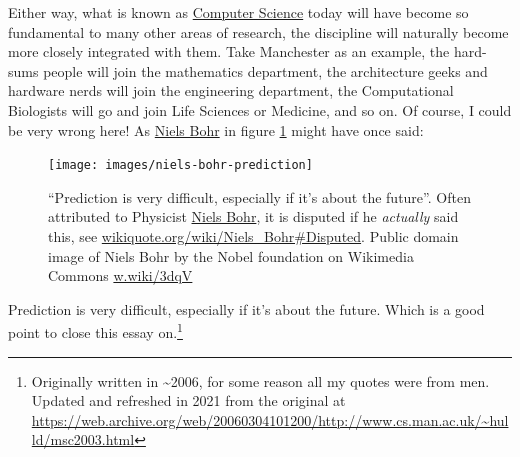 \documentclass[
  12pt,
]{book}
\begin{document}
Either way, what is known as \href{https://en.wikipedia.org/wiki/Computer_science}{Computer Science} today will have become so fundamental to many other areas of research, the discipline will naturally become more closely integrated with them. Take Manchester as an example, the hard-sums people will join the mathematics department, the architecture geeks and hardware nerds will join the engineering department, the Computational Biologists will go and join Life Sciences or Medicine, and so on. Of course, I could be very wrong here! As \href{https://en.wikipedia.org/wiki/Niels_Bohr}{Niels Bohr} in figure \ref{fig:bohr-fig} might have once said:

\begin{figure}

{\centering \texttt{[image: images/niels-bohr-prediction]} 

}

\caption{``Prediction is very difficult, especially if it's about the future''. Often attributed to Physicist \href{https://en.wikipedia.org/wiki/Niels_Bohr}{Niels Bohr}, it is disputed if he \emph{actually} said this, see \href{https://en.wikiquote.org/wiki/Niels_Bohr\#Disputed}{wikiquote.org/wiki/Niels\_Bohr\#Disputed}. Public domain image of Niels Bohr by the Nobel foundation on Wikimedia Commons \href{https://w.wiki/3dqV}{w.wiki/3dqV}}\label{fig:bohr-fig}
\end{figure}



Prediction is very difficult, especially if it's about the future. Which is a good point to close this essay on.\footnote{Originally written in \textasciitilde2006, for some reason all my quotes were from men. Updated and refreshed in 2021 from the original at \url{https://web.archive.org/web/20060304101200/http://www.cs.man.ac.uk/~hulld/msc2003.html}}

  
\end{document}
